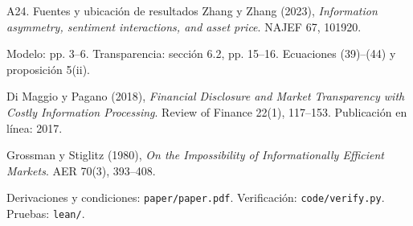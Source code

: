 \documentclass[aspectratio=169,11pt]{beamer}
\begin{document}
\begin{frame}{A24. Fuentes y ubicación de resultados}
\small
Zhang y Zhang (2023), \emph{Information asymmetry, sentiment interactions,
and asset price}. NAJEF 67, 101920.
\par\medskip
Modelo: pp. 3--6. Transparencia: sección 6.2, pp. 15--16.
Ecuaciones (39)--(44) y proposición 5(ii).
\par\medskip
Di Maggio y Pagano (2018), \emph{Financial Disclosure and Market
Transparency with Costly Information Processing}. Review of Finance 22(1),
117--153. Publicación en línea: 2017.
\par\medskip
Grossman y Stiglitz (1980), \emph{On the Impossibility of Informationally
Efficient Markets}. AER 70(3), 393--408.
\par\medskip
Derivaciones y condiciones: \texttt{paper/paper.pdf}.
Verificación: \texttt{code/verify.py}. Pruebas: \texttt{lean/}.
\end{frame}
\end{document}
